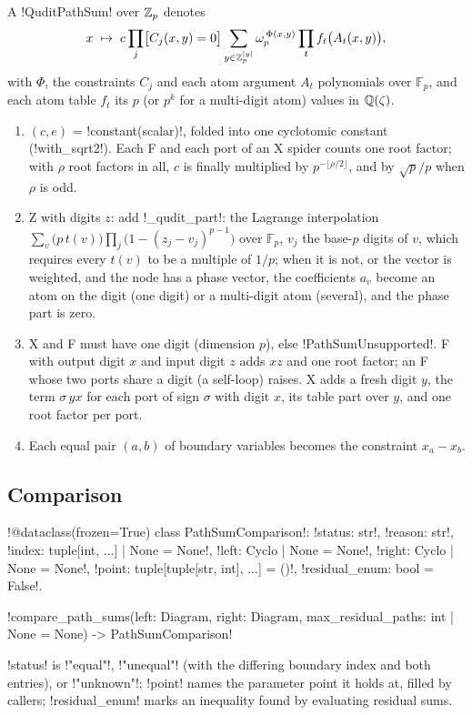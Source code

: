 \begin{definition}\label{def:semantics-qudit-pathsum}
A \py!QuditPathSum! over $\mathbb{Z}_p$ denotes
\[
x\;\mapsto\;c\prod_j\bigl[C_j(x,y)=0\bigr]\sum_{y\in\mathbb{Z}_p^{|y|}}\omega_p^{\,\Phi(x,y)}\prod_t f_t\bigl(A_t(x,y)\bigr),
\]
with $\Phi$, the constraints $C_j$ and each atom argument $A_t$ polynomials over $\mathbb F_p$, and each atom table $f_t$ its $p$ (or $p^k$ for a multi-digit atom) values in $\mathbb{Q}(\zeta)$.
\end{definition}

\begin{algorithm}\label{alg:semantics-qudit}
\begin{enumerate}
\item $(c,e)$ = \py!constant(scalar)!, folded into one cyclotomic constant (\py!with_sqrt2!). Each F and each port of an X spider counts one root factor; with $\rho$ root factors in all, $c$ is finally multiplied by $p^{-\lfloor\rho/2\rfloor}$, and by $\sqrt p/p$ when $\rho$ is odd.
\item Z with digits $z$: add \py!_qudit_part!: the Lagrange interpolation $\sum_v \bigl(p\,t(v)\bigr)\prod_j\bigl(1-(z_j-v_j)^{p-1}\bigr)$ over $\mathbb F_p$, $v_j$ the base-$p$ digits of $v$, which requires every $t(v)$ to be a multiple of $1/p$; when it is not, or the vector is weighted, and the node has a phase vector, the coefficients $a_v$ become an atom on the digit (one digit) or a multi-digit atom (several), and the phase part is zero.
\item X and F must have one digit (dimension $p$), else \py!PathSumUnsupported!. F with output digit $x$ and input digit $z$ adds $xz$ and one root factor; an F whose two ports share a digit (a self-loop) raises. X adds a fresh digit $y$, the term $\sigma\,yx$ for each port of sign $\sigma$ with digit $x$, its table part over $y$, and one root factor per port.
\item Each equal pair $(a,b)$ of boundary variables becomes the constraint $x_a-x_b$.
\end{enumerate}
\end{algorithm}

\subsection{Comparison}

\begin{signature}
\py!@dataclass(frozen=True) class PathSumComparison!: \py!status: str!, \py!reason: str!, \py!index: tuple[int, ...] | None = None!, \py!left: Cyclo | None = None!, \py!right: Cyclo | None = None!, \py!point: tuple[tuple[str, int], ...] = ()!, \py!residual_enum: bool = False!.

\py!compare_path_sums(left: Diagram, right: Diagram, max_residual_paths: int | None = None) -> PathSumComparison!
\end{signature}
\noindent \py!status! is \code!"equal"!, \code!"unequal"! (with the differing boundary index and both entries), or \code!"unknown"!; \py!point! names the parameter point it holds at, filled by callers; \py!residual_enum! marks an inequality found by evaluating residual sums.

